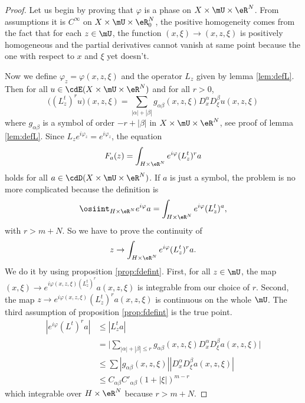 \begin{proof}
Let us begin by proving that $\varphi$ is a phase on $X\times\mU\times\eR^N$. From assumptions it is $C^{\infty}$ on $X\times\mU\times\eR^N_0$, the positive homogeneity comes from the fact that for each $z\in\mU$, the function $(x,\xi)\to(x,z,\xi)$ is positively homogeneous and the partial derivatives cannot vanish at same point because the one with respect to $x$ and $\xi$ yet doesn't.

Now we define $\varphi_z=\varphi(x,z,\xi)$ and the operator $L_z$ given by lemma \ref{lem:defL}. Then for all $u\in\cdE(X\times\mU\times\eR^N)$ and for all $r>0$,
\[ 
 \big((L_z^t)^ru\big)(x,z,\xi)=\sum_{| \alpha |+| \beta |}g_{\alpha\beta}(x,z,\xi)D_x^{\alpha}D_{\xi}^{\beta}u(x,z,\xi)
\]
where $g_{\alpha\beta}$ is a symbol of order $-r+| \beta |$ in $X\times\mU\times\eR^N$, see proof of lemma \ref{lem:defL}. Since $L_ze^{i\varphi_z}=e^{i\varphi_z}$, the equation
\[ 
  F_a(z)=\int_{H\times\eR^N}e^{i\varphi}(L_z^t)^ra
\]
holds for all $a\in\cdD(X\times\mU\times\eR^N)$. If $a$ is just a symbol, the problem is no more complicated because the definition is
\[ 
  \osiint_{H\times\eR^N}e^{i\varphi}a=\int_{H\times\eR^N}e^{i\varphi}(L_z^t)^a,
\]
with $r>m+N$. So we have to prove the continuity of
\[ 
  z\to\int_{H\times\eR^N}e^{i\varphi}(L_z^t)^ra.
\]
We do it by using proposition \ref{prop:fdefint}. First, for all $z\in\mU$, the map $(x,\xi)\to e^{i\varphi(x,z,\xi)(L_z^t)^r}a(x,z,\xi)$ is integrable from our choice of $r$. Second, the map $z\to e^{i\varphi(x,z,\xi)}(L_z^t)^ra(x,z,\xi)$ is continuous on the whole $\mU$. The third assumption of proposition \ref{prop:fdefint} is the true point.
\begin{equation}
\begin{split}
  | e^{i\varphi}(L^t)^ra |	&\leq | L_z^ta |\\
				&=\Big| \sum_{| \alpha |+| \beta |\leq r}g_{\alpha\beta}(x,z,\xi)D_x^{\alpha}D_{\xi}^{\beta}a(x,z,\xi)    \Big|\\
				&\leq \sum | g_{\alpha\beta}(x,z,\xi) | |D_x^{\alpha}D_{\xi}^{\beta}a(x,z,\xi) |\\
				&\leq C_{\alpha\beta}C'_{\alpha\beta}(1+| \xi |)^{m-r}
\end{split}
\end{equation}
which integrable over $H\times\eR^N$ because $r>m+N$.


\end{proof}
